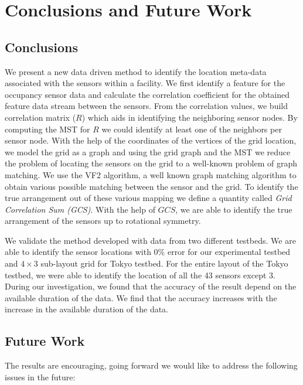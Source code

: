 \chapter{Conclusions and Future Work}
\label{chp:conclusionsandfuturework}
\newcommand\blfootnote[1]{%
  \begingroup
  \renewcommand\thefootnote{}\footnote{#1}%
  \addtocounter{footnote}{-1}%
  \endgroup
}

\section{Conclusions}

We present a new data driven method to identify the location meta-data associated with the sensors within a facility. We first identify a feature for the occupancy sensor data and calculate the correlation coefficient for the obtained feature data stream between the sensors. From the correlation values, we build correlation matrix ($R$)  which aids in identifying the neighboring sensor nodes. By computing the MST for $R$ we could identify at least one of the neighbors per sensor node. With the help of the coordinates of the vertices of the grid location, we model the grid as a graph and using the grid graph and the MST we reduce the problem of locating the sensors on the grid to a well-known problem of graph matching. We use the VF2 algorithm, a well known graph matching algorithm to obtain various possible matching between the sensor and the grid. To identify the true arrangement out of these various mapping we define a quantity called \textit{Grid Correlation Sum (GCS)}. With the help of $GCS$, we are able to identify the true arrangement of the sensors up to rotational symmetry. 

We validate the method developed with data from two different testbeds. We are able to identify the sensor locations with 0\% error for our experimental testbed and $4\times3$ sub-layout grid for Tokyo testbed.
For the entire layout of the Tokyo testbed, we were able to identify the location of all the 43 sensors except 3.
During our investigation, we found  that the accuracy of the result depend on the available duration of the data.
We find that the accuracy increases with the increase in the available duration of the data.


\section{Future Work}
The results are encouraging, going forward we would like to address the following issues in the future:

